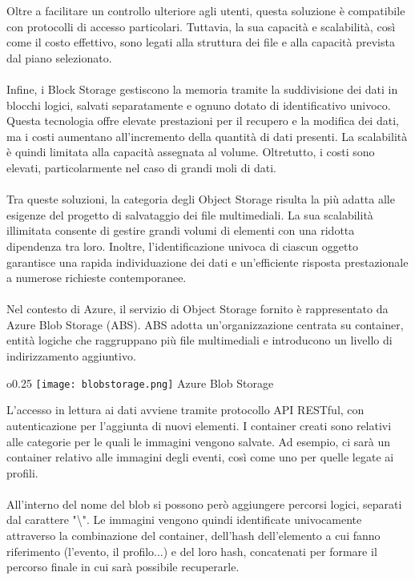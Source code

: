Oltre a facilitare un controllo ulteriore agli utenti, 
questa soluzione è compatibile con protocolli di accesso particolari. 
Tuttavia, la sua capacità e scalabilità, così come il costo effettivo, 
sono legati alla struttura dei file e alla capacità prevista dal piano selezionato.\\
\\
Infine,
i Block Storage gestiscono la memoria tramite la suddivisione dei dati in blocchi logici,
salvati separatamente e ognuno dotato di identificativo univoco. 
Questa tecnologia offre elevate prestazioni per il recupero e la modifica dei dati, 
ma i costi aumentano all'incremento della quantità di dati presenti. 
La scalabilità è quindi limitata alla capacità assegnata al volume. 
Oltretutto, i costi sono elevati, particolarmente nel caso di grandi moli di dati.\\
\\
Tra queste soluzioni, 
la categoria degli Object Storage risulta la più adatta alle esigenze del progetto
di salvataggio dei file multimediali. 
La sua scalabilità illimitata consente di gestire grandi volumi di elementi 
con una ridotta dipendenza tra loro. 
Inoltre,
l'identificazione univoca di ciascun oggetto garantisce una rapida individuazione dei dati e 
un'efficiente risposta prestazionale a numerose richieste contemporanee.\\
\\
Nel contesto di Azure, 
il servizio di Object Storage fornito è rappresentato da Azure Blob Storage (ABS). 
ABS adotta un'organizzazione centrata su container, 
entità logiche che raggruppano più file multimediali e introducono un livello di indirizzamento aggiuntivo. 
\begin{wrapfigure}{o}{0.25\textwidth}
    \centering
    \texttt{[image: blobstorage.png]}
    Azure Blob Storage
\end{wrapfigure}
L'accesso in lettura ai dati avviene tramite protocollo API RESTful, 
con autenticazione per l'aggiunta di nuovi elementi. 
I container creati sono relativi alle categorie per le quali le immagini vengono salvate.
Ad esempio, ci sarà un container relativo alle immagini degli eventi,
così come uno per quelle legate ai profili.\\
\\
All'interno del nome del blob si possono però aggiungere percorsi logici, 
separati dal carattere "\textbackslash".
Le immagini vengono quindi identificate univocamente attraverso la combinazione 
del container, dell'hash dell'elemento a cui fanno riferimento (l'evento, il profilo...) 
e del loro hash, concatenati per formare il percorso finale in cui sarà possibile recuperarle.

